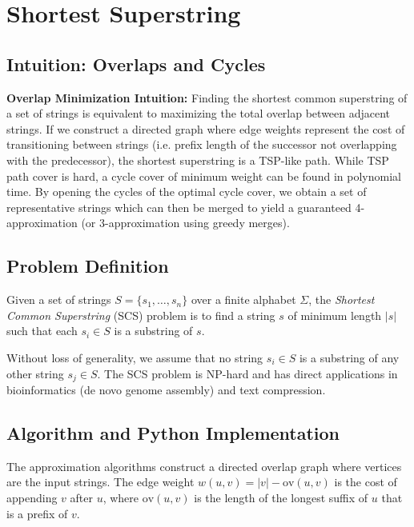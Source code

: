 \chapter{Shortest Superstring}
\label{ch:superstring}

\section{Intuition: Overlaps and Cycles}

\begin{intuitionbox}
\textbf{Overlap Minimization Intuition:} Finding the shortest common superstring of a set of strings is equivalent to maximizing the total overlap between adjacent strings. If we construct a directed graph where edge weights represent the cost of transitioning between strings (i.e. prefix length of the successor not overlapping with the predecessor), the shortest superstring is a TSP-like path. While TSP path cover is hard, a cycle cover of minimum weight can be found in polynomial time. By opening the cycles of the optimal cycle cover, we obtain a set of representative strings which can then be merged to yield a guaranteed 4-approximation (or 3-approximation using greedy merges).
\end{intuitionbox}

\section{Problem Definition}
Given a set of strings $S = \{s_1, \dots, s_n\}$ over a finite alphabet $\Sigma$, the \emph{Shortest Common Superstring} (SCS) problem is to find a string $s$ of minimum length $|s|$ such that each $s_i \in S$ is a substring of $s$.

Without loss of generality, we assume that no string $s_i \in S$ is a substring of any other string $s_j \in S$. The SCS problem is NP-hard and has direct applications in bioinformatics (de novo genome assembly) and text compression.

\section{Algorithm and Python Implementation}
The approximation algorithms construct a directed overlap graph where vertices are the input strings. The edge weight $w(u, v) = |v| - \text{ov}(u, v)$ is the cost of appending $v$ after $u$, where $\text{ov}(u, v)$ is the length of the longest suffix of $u$ that is a prefix of $v$. 

